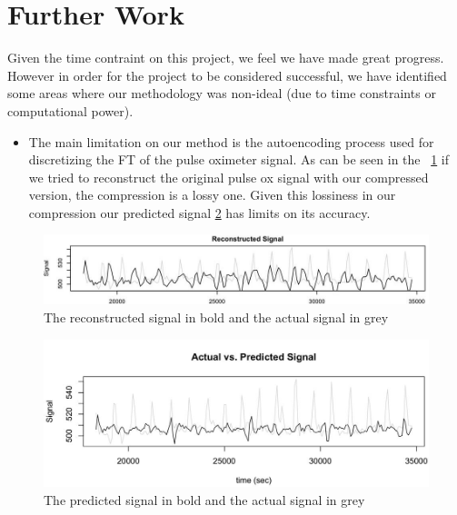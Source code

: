 \documentclass[12pt]{article}
\begin{document}
 \section{Further Work}
  Given the time contraint on this project, we feel we have made great progress.
 However in order for the project to be considered successful, we have identified some areas where our methodology was non-ideal (due to time constraints or computational power).
 \begin{itemize}
 \item{The main limitation on our method is the autoencoding process used for discretizing the FT of the pulse oximeter signal. As can be seen in the ~\ref{figure:reconst} if we tried to reconstruct the original pulse ox signal with our compressed version, the compression is a lossy one. Given this lossiness in our compression our predicted signal \ref{figure:pred} has limits on its accuracy.}

 
 \end{itemize}
 
 \begin{figure}
\captionsetup{justification=centering}
\label{figure:reconst}
\includegraphics[width=\textwidth]{images/reconst_signal.jpg}
\caption{The reconstructed signal in bold and the actual signal in grey}
\end{figure}
 \begin{figure}
\captionsetup{justification=centering}
\label{figure:pred}
\includegraphics[width=\textwidth]{images/actual_vs_pred_signal.jpg}
\caption{The predicted signal in bold and the actual signal in grey}
\end{figure}


  
\end{document}
